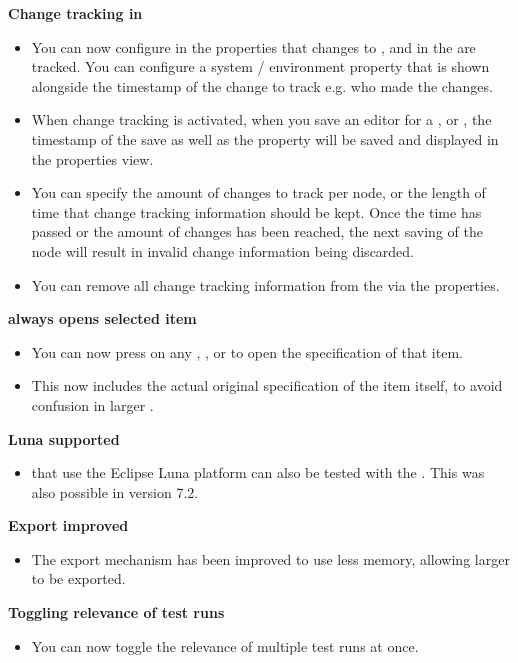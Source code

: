 \textbf{Change tracking in \gdprojects{}}
\begin{itemize}
\item You can now configure in the \gdproject{} properties that changes to \gdcases{}, \gdsuites{} and \gdjobs{} in the \gdproject{} are tracked. You can configure a system / environment property that is shown alongside the timestamp of the change to track e.g. who made the changes. 
\item When change tracking is activated, when you save an editor for a \gdcase{}, \gdsuite{} or \gdjob{}, the timestamp of the save as well as the property will be saved and displayed in the properties view.
\item You can specify the amount of changes to track per node, or the length of time that change tracking information should be kept. Once the time has passed or the amount of changes has been reached, the next saving of the node will result in invalid change information being discarded.
\item You can remove all change tracking information from the \gdproject{} via the \gdproject{} properties. 
\end{itemize}

\textbf{ always opens selected item}
\begin{itemize}
\item You can now press  on any \gdcase{}, \gdsuite{}, or \gdjob{} to open the specification of that item.
\item This now includes the actual original specification of the item itself, to avoid confusion in larger \gdprojects{}. 
\end{itemize}

\textbf{Luna \gdauts{} supported}
\begin{itemize}
\item \gdauts{} that use the Eclipse Luna platform can also be tested with the \ite{}. This was also possible in version 7.2.
\end{itemize}

\textbf{Export improved}
\begin{itemize}
\item The export mechanism has been improved to use less memory, allowing larger \gdprojects{} to be exported.
\end{itemize}

\textbf{Toggling relevance of test runs}
\begin{itemize}
\item You can now toggle the relevance of multiple test runs at once.
\end{itemize}
